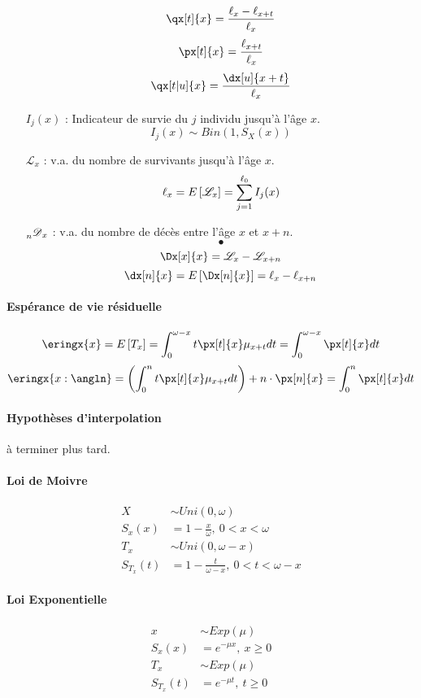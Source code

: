 \documentclass[10pt, french]{article}
\begin{document}
\begin{multicols*}{3}
\begin{itemize}
\[\qx[t]{x} = \frac{\ell_x - \ell_{x+t}}{\ell_x}\]
\[\px[t]{x} = \frac{\ell_{x+t}}{\ell_x} \]
\[\qx[t|u]{x} = \frac{\dx[u]{x+t}}{\ell_x}\]

\item[$I_j(x)$ : ] Indicateur de survie du $j$ individu jusqu'à l'âge $x$.
\[I_j(x) \sim Bin(1, S_X(x))\]
\item[$\mathscr{L}_x$ : ] v.a. du nombre de survivants jusqu'à l'âge $x$.
\[\ell_x = E \left[ \mathscr{L}_x \right] = \sum_{j=1}^{\ell_0} I_j(x)\]

\item[$\prescript{}{n}{\mathscr{D}}_x$ : ] v.a. du nombre de décès entre l'âge $x$ et $x+n$.
\[•\]
\[\Dx[x]{x} = \mathscr{L}_x - \mathscr{L}_{x+n}\]
\[\dx[n]{x} = \esp{\Dx[n]{x}} = \ell_{x} - \ell_{x+n} \]
\end{itemize}
\paragraph{Espérance de vie résiduelle}
\[\eringx{x} = \esp{T_x} =  \int_{0}^{\omega - x} t \px[t]{x} \mu_{x+t} dt= \int_{0}^{\omega - x} \px[t]{x} dt \]
\[\eringx{x:\angln} = \left( \int_{0}^{n} t \px[t]{x} \mu_{x+t} dt   \right) + n \cdot \px[n]{x} = \int_{0}^{n} \px[t]{x} dt \]


\paragraph{Hypothèses d'interpolation}
à terminer plus tard.

\paragraph{Loi de Moivre}
\begin{align*}
	X &\sim Uni(0, \omega) \\
	S_x(x) &= 1 - \frac{x}{\omega},\: 0 < x < \omega \\
	T_x &\sim Uni(0, \omega - x) \\
	S_{T_x}(t) &= 1 - \frac{t}{\omega - x},\: 0 < t < \omega - x
\end{align*}

\paragraph{Loi Exponentielle}
\begin{align*}
	x &\sim Exp(\mu) \\
	S_x(x) &= e^{-\mu x},\: x \geq 0 \\
	T_x &\sim Exp(\mu) \\
	S_{T_x}(t) &= e^{-\mu t},\: t \geq 0
\end{align*}


\end{multicols*}
\end{document}
